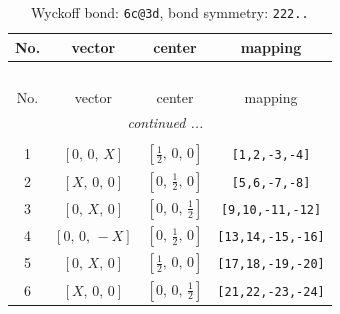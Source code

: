 \documentclass[fleqn,8pt]{jsarticle}
\begin{document}
\begin{longtable}{cccc}
\caption{Wyckoff bond: {\tt 6c@3d}, bond symmetry: {\tt 222..}}
 \\
 \hline \hline
No. & vector & center & mapping \\ \hline \endfirsthead

\multicolumn{3}{l}{\tablename\ \thetable{}} \\
 \hline \hline
No. & vector & center & mapping \\ \hline \endhead

 \hline \hline
\multicolumn{3}{r}{\footnotesize\it continued ...} \\ \endfoot

 \hline \hline
\multicolumn{3}{r}{} \\ \endlastfoot

1 & $\left[ 0,\, 0,\, X \right]$ & $\left[ \frac{1}{2},\, 0,\, 0 \right]$ & {\tt [1,2,-3,-4]} \\ \hline
2 & $\left[ X,\, 0,\, 0 \right]$ & $\left[ 0,\, \frac{1}{2},\, 0 \right]$ & {\tt [5,6,-7,-8]} \\ \hline
3 & $\left[ 0,\, X,\, 0 \right]$ & $\left[ 0,\, 0,\, \frac{1}{2} \right]$ & {\tt [9,10,-11,-12]} \\ \hline
4 & $\left[ 0,\, 0,\, - X \right]$ & $\left[ 0,\, \frac{1}{2},\, 0 \right]$ & {\tt [13,14,-15,-16]} \\ \hline
5 & $\left[ 0,\, X,\, 0 \right]$ & $\left[ \frac{1}{2},\, 0,\, 0 \right]$ & {\tt [17,18,-19,-20]} \\ \hline
6 & $\left[ X,\, 0,\, 0 \right]$ & $\left[ 0,\, 0,\, \frac{1}{2} \right]$ & {\tt [21,22,-23,-24]} \\
\end{longtable}
\renewcommand{\arraystretch}{1.2}
\end{document}
